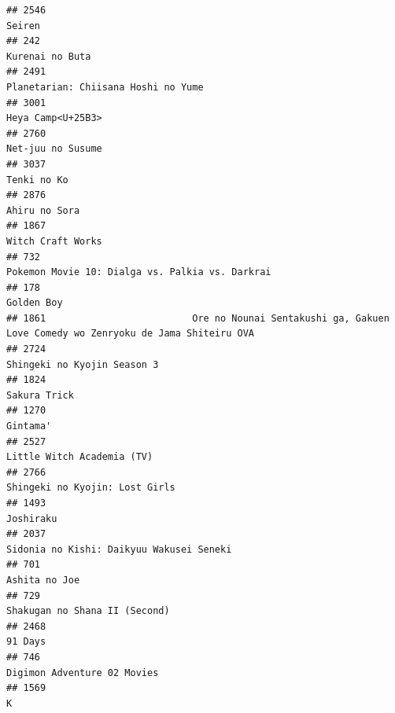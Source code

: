 \documentclass[
]{article}
\begin{document}
\begin{verbatim}
## 2546                                                                                                    Seiren
## 242                                                                                            Kurenai no Buta
## 2491                                                                       Planetarian: Chiisana Hoshi no Yume
## 3001                                                                                         Heya Camp<U+25B3>
## 2760                                                                                         Net-juu no Susume
## 3037                                                                                               Tenki no Ko
## 2876                                                                                             Ahiru no Sora
## 1867                                                                                         Witch Craft Works
## 732                                                            Pokemon Movie 10: Dialga vs. Palkia vs. Darkrai
## 178                                                                                                 Golden Boy
## 1861                          Ore no Nounai Sentakushi ga, Gakuen Love Comedy wo Zenryoku de Jama Shiteiru OVA
## 2724                                                                               Shingeki no Kyojin Season 3
## 1824                                                                                              Sakura Trick
## 1270                                                                                                  Gintama'
## 2527                                                                                Little Witch Academia (TV)
## 2766                                                                            Shingeki no Kyojin: Lost Girls
## 1493                                                                                                 Joshiraku
## 2037                                                                  Sidonia no Kishi: Daikyuu Wakusei Seneki
## 701                                                                                              Ashita no Joe
## 729                                                                              Shakugan no Shana II (Second)
## 2468                                                                                                   91 Days
## 746                                                                                Digimon Adventure 02 Movies
## 1569                                                                                                         K

\end{verbatim}
\end{document}
